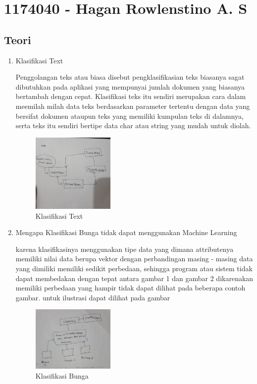 \section{1174040 - Hagan Rowlenstino A. S}
    \subsection{Teori}
    \begin{enumerate}
        \item Klasifikasi Text
        
        Penggolangan teks atau biasa disebut pengklasifikasian teks biasanya sagat dibutuhkan pada aplikasi yang mempunyai jumlah dokumen yang biasanya bertambah dengan cepat. Klasifikasi teks itu sendiri merupakan cara dalam meemilah milah data teks berdasarkan parameter tertentu dengan data yang bersifat dokumen ataupun teks yang memiliki kumpulan teks di dalamnya, serta teks itu sendiri bertipe data char atau string yang mudah untuk diolah.
        \begin{figure}[H]
            \includegraphics[width=4cm]{figures/1174040/chapter4/klasifikasi.jpeg}
            \centering
            \caption{Klasifikasi Text}
        \end{figure}

        \item Mengapa Klasifikasi Bunga tidak dapat menggunakan Machine Learning
        
        karena klasifikasinya menggunakan tipe data yang dimana attributenya memiliki nilai data berupa vektor dengan perbandingan masing - masing data yang dimiliki memiliki sedikit perbedaan, sehingga program atau sistem tidak dapat membedakan dengan tepat antara gambar 1 dan gambar 2 dikarenakan memiliki perbedaan yang hampir tidak dapat dilihat pada beberapa contoh gambar. untuk ilustrasi dapat dilihat pada gambar
        \begin{figure}[H]
            \includegraphics[width=4cm]{figures/1174040/chapter4/bunga.jpeg}
            \centering
            \caption{Klasifikasi Bunga}
        \end{figure}


\end{enumerate}
